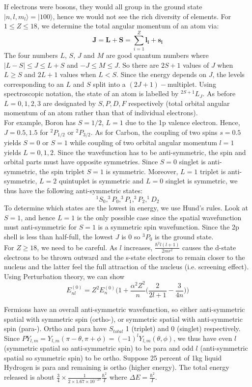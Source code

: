 \documentclass[a4paper]{article}
\begin{document}
\begin{eg}
If electrons were bosons, they would all group in the ground state $|n,l,m_l\rangle=|100\rangle$, hence we would not see the rich diversity of elements. For $1\leq Z\leq 18$, we determine the total angular momentum of an atom via:
$$\mathbf{J}=\mathbf{L}+\mathbf{S}=\sum_{i=1}^Z\mathbf{l_i}+\mathbf{s_i}$$
The four numbers $L$, $S$, $J$ and $M$ are good quantum numbers where $|L-S|\leq J\leq L+S$ and $-J\leq M\leq J$. So there are $2S+1$ values of $J$ when $L\geq S$ and $2L+1$ values when $L<S$. Since the energy depends on $J$, the levels corresponding to an $L$ and $S$ split into a $(2J+1)-$multiplet. Using spectroscopic notation, the state of an atom is labelled by $^{2S+1}L_J$. As before $L=0,1,2,3$ are designated by $S,P,D,F$ respectively (total orbital angular momentum of an atom rather than that of individual electrons).\\[5pt]
For example, Boron has $S=1/2$, $L=1$ due to the 1p valence electron. Hence, $J=0.5,1.5$ for $^2P_{1/2}$ or $^2P_{3/2}$. As for Carbon, the coupling of two spins $s=0.5$ yields $S=0$ or $S=1$ while coupling of two orbital angular momentum $l=1$ yields $L=0,1,2$. Since the wavefunction has to be anti-symmetric, the spin and orbital parts must have opposite symmetries. Since $S=0$ singlet is anti-symmetric, the spin triplet $S=1$ is symmetric. Moreover, $L=1$ triplet is anti-symmetric, $L=2$ quintuplet is symmetric and $L=0$ singlet is symmetric, we thus have the following anti-symmetric states:
$$^1S_0,^3P_0, ^3P_1,^3P_2,^1D_2$$
To determine which states are the lowest in energy, we use Hund's rules. Look at $S=1$, and hence $L=1$ is the only possible case since the spatial wavefunction must anti-symmetric for $S=1$ is a symmetric spin wavefunction. Since the 2p shell is less than half-full, the lowest $J$ is 0 so $^3P_0$ is the ground state.\\[5pt]
For $Z\geq 18$, we need to be careful. As $l$ increases, $\frac{\hbar^2l(l+1)}{2mr^2}$ causes the d-state electrons to be thrown outward and the s-state electrons to remain closer to the nucleus and the latter feel the full attraction of the nucleus (i.e. screening effect). Using Perturbation theory, we can show 
$$E_{nl}^{(0)}=Z^2E_n^{(0)}\bigg(1+\frac{\alpha^2Z^2}{n}\bigg(\frac{2}{2l+1}-\frac{3}{4n}\bigg)\bigg)$$
\end{eg}
\begin{eg}
Fermions have an overall anti-symmetric wavefunction, so either anti-symmetric spatial with symmetric spin (ortho-), or symmetric spatial with anti-symmetric spin (para-). Ortho and para have $S_{total}$ 1 (triplet) and 0 (singlet) respectively. Since $PY_{l,m}=Y_{l,m}(\pi-\theta,\pi+\phi)=(-1)^lY_{l,m}(\theta,\phi)$, we thus have even $l$ (symmetric spatial so anti-symmetric spin) to be para and odd $l$ (anti-symmetric spatial so symmetric spin) to be ortho. Suppose 25 percent of 1kg liquid Hydrogen is para and remaining is ortho (higher energy). The total energy released is about $\frac{3}{4}\times\frac{1}{2\times1.67\times10^{-27}}\frac{\hbar^2}{I}$ where $\Delta E=\frac{\hbar^2}{I}$. 
\end{eg}
\newpage
\end{document}
